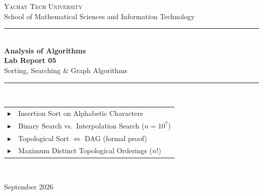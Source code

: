 \documentclass[12pt,a4paper]{article}
\theoremstyle{plain}
\theoremstyle{definition}
\theoremstyle{remark}
\begin{document}
\begin{titlepage}
  \centering
  \vspace*{1.5cm}

  {\Large\scshape\color{primary} Yachay Tech University}\\[0.3em]
  {\normalsize School of Mathematical Sciences and Information Technology}\\[2em]

  \color{primary!40}\rule{0.75\linewidth}{1pt}\color{black}\\[1.5em]

  {\fontsize{26}{32}\selectfont\bfseries\color{primary}
    Analysis of Algorithms}\\[0.5em]
  {\LARGE\bfseries\color{accent} Lab Report 05}\\[0.4em]
  {\large\color{primary!70}
    Sorting, Searching \& Graph Algorithms}\\[1em]

  \color{primary!40}\rule{0.75\linewidth}{1pt}\color{black}\\[2em]

  \begin{minipage}{0.65\linewidth}
    \centering
    \begin{tabular}{@{}cl@{}}
      \color{accent}$\blacktriangleright$ & Insertion Sort on Alphabetic Characters \\[3pt]
      \color{accent}$\blacktriangleright$ & Binary Search vs.\ Interpolation Search ($n = 10^7$) \\[3pt]
      \color{accent}$\blacktriangleright$ & Topological Sort $\Leftrightarrow$ DAG (formal proof) \\[3pt]
      \color{accent}$\blacktriangleright$ & Maximum Distinct Topological Orderings ($n!$) \\
    \end{tabular}
  \end{minipage}\\[3em]

  \vfill

  {\normalsize September 2026}
\end{titlepage}

\tableofcontents
\newpage
\end{document}
